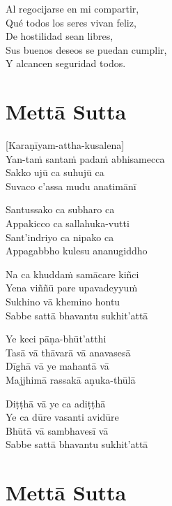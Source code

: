 \begin{english}
	Al regocijarse en mi compartir,\\
	Qué todos los seres vivan feliz,\\
	De hostilidad sean libres,\\
	Sus buenos deseos se puedan cumplir,\\
	Y alcancen seguridad todos.
\end{english}

\chapter*[Mettā Sutta]{Mettā Sutta}

\delegateSetUseNext


\begin{leader}
\end{leader}

[Karaṇīyam-attha-kusalena]\\
Yan-taṁ santaṁ padaṁ abhisamecca\\
Sakko ujū ca suhujū ca\\
Suvaco c'assa mudu anatimānī

Santussako ca subharo ca\\
Appakicco ca sallahuka-vutti\\
Sant'indriyo ca nipako ca\\
Appagabbho kulesu ananugiddho

Na ca khuddaṁ samācare kiñci\\
Yena viññū pare upavadeyyuṁ\\
Sukhino vā khemino hontu\\
Sabbe sattā bhavantu sukhit'attā

Ye keci pāṇa-bhūt'atthi\\
Tasā vā thāvarā vā anavasesā\\
Dīghā vā ye mahantā vā\\
Majjhimā rassakā aṇuka-thūlā

Diṭṭhā vā ye ca adiṭṭhā\\
Ye ca dūre vasanti avidūre\\
Bhūtā vā sambhavesī vā\\
Sabbe sattā bhavantu sukhit'attā

\chapter[Mettā Sutta]{Mettā Sutta}

